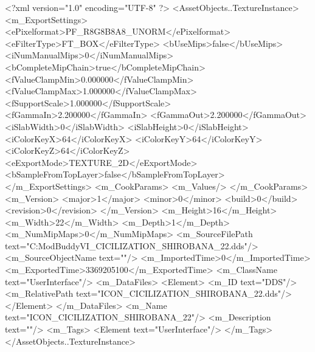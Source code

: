 <?xml version="1.0" encoding="UTF-8" ?>
<AssetObjects..TextureInstance>
	<m_ExportSettings>
		<ePixelformat>PF_R8G8B8A8_UNORM</ePixelformat>
		<eFilterType>FT_BOX</eFilterType>
		<bUseMips>false</bUseMips>
		<iNumManualMips>0</iNumManualMips>
		<bCompleteMipChain>true</bCompleteMipChain>
		<fValueClampMin>0.000000</fValueClampMin>
		<fValueClampMax>1.000000</fValueClampMax>
		<fSupportScale>1.000000</fSupportScale>
		<fGammaIn>2.200000</fGammaIn>
		<fGammaOut>2.200000</fGammaOut>
		<iSlabWidth>0</iSlabWidth>
		<iSlabHeight>0</iSlabHeight>
		<iColorKeyX>64</iColorKeyX>
		<iColorKeyY>64</iColorKeyY>
		<iColorKeyZ>64</iColorKeyZ>
		<eExportMode>TEXTURE_2D</eExportMode>
		<bSampleFromTopLayer>false</bSampleFromTopLayer>
	</m_ExportSettings>
	<m_CookParams>
		<m_Values/>
	</m_CookParams>
	<m_Version>
		<major>1</major>
		<minor>0</minor>
		<build>0</build>
		<revision>0</revision>
	</m_Version>
	<m_Height>16</m_Height>
	<m_Width>22</m_Width>
	<m_Depth>1</m_Depth>
	<m_NumMipMaps>0</m_NumMipMaps>
	<m_SourceFilePath text="C:\Users\asus\Documents\Firaxis ModBuddy\Civilization VI\temppic\ICON_CICILIZATION_SHIROBANA_22.dds"/>
	<m_SourceObjectName text=""/>
	<m_ImportedTime>0</m_ImportedTime>
	<m_ExportedTime>3369205100</m_ExportedTime>
	<m_ClassName text="UserInterface"/>
	<m_DataFiles>
		<Element>
			<m_ID text="DDS"/>
			<m_RelativePath text="ICON_CICILIZATION_SHIROBANA_22.dds"/>
		</Element>
	</m_DataFiles>
	<m_Name text="ICON_CICILIZATION_SHIROBANA_22"/>
	<m_Description text=""/>
	<m_Tags>
		<Element text="UserInterface"/>
	</m_Tags>
</AssetObjects..TextureInstance>

